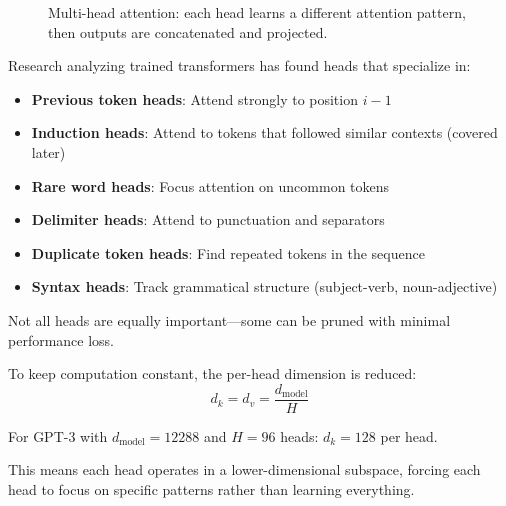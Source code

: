 \begin{figure}[h]
\caption{Multi-head attention: each head learns a different attention pattern, then outputs are concatenated and projected.}
\end{figure}

\begin{example}
    Research analyzing trained transformers has found heads that specialize in:

    \begin{itemize}
        \item \textbf{Previous token heads}: Attend strongly to position $i-1$
        \item \textbf{Induction heads}: Attend to tokens that followed similar contexts (covered later)
        \item \textbf{Rare word heads}: Focus attention on uncommon tokens
        \item \textbf{Delimiter heads}: Attend to punctuation and separators
        \item \textbf{Duplicate token heads}: Find repeated tokens in the sequence
        \item \textbf{Syntax heads}: Track grammatical structure (subject-verb, noun-adjective)
    \end{itemize}

    Not all heads are equally important---some can be pruned with minimal performance loss.
\end{example}

\begin{remark}
    To keep computation constant, the per-head dimension is reduced:
    \[
        d_k = d_v = \frac{d_{\text{model}}}{H}
    \]

    For GPT-3 with $d_{\text{model}} = 12288$ and $H = 96$ heads: $d_k = 128$ per head.

    This means each head operates in a lower-dimensional subspace, forcing each head to focus on specific patterns rather than learning everything.
\end{remark}

